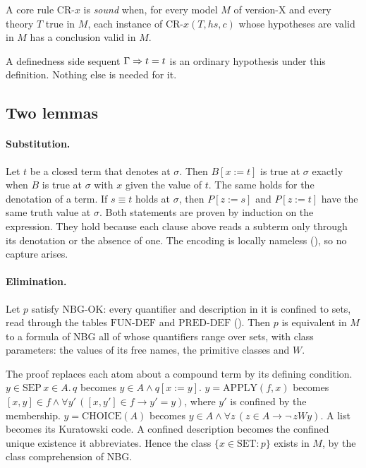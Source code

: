 \begin{dfn}\label{dfn:meta-sound}
A core rule $\mathrm{CR}\text{-}x$ is \emph{sound} when, for every model
$M$ of version-X and every theory $T$ true in $M$, each instance of
$\mathrm{CR}\text{-}x(T, \mathit{hs}, c)$ whose hypotheses are valid in
$M$ has a conclusion valid in $M$.
\end{dfn}

A definedness side sequent $\Gamma\Rightarrow t=t$ is an ordinary hypothesis
under this definition.  Nothing else is needed for it.

\subsection{Two lemmas}

\paragraph{Substitution.}  Let $t$ be a closed term that denotes at
$\sigma$.  Then $B[x:=t]$ is true at $\sigma$ exactly when $B$ is true
at $\sigma$ with $x$ given the value of $t$.  The same holds for the
denotation of a term.  If $s\equiv t$ holds at $\sigma$, then $P[z:=s]$
and $P[z:=t]$ have the same truth value at $\sigma$.  Both statements
are proven by induction on the expression.  They hold because each clause
above reads a subterm only through its denotation or the absence of one.
The encoding is locally nameless (), so no capture arises.

\paragraph{Elimination.}  Let $p$ satisfy $\mathrm{NBG\text{-}OK}$: every
quantifier and description in it is confined to sets, read through the
tables $\mathrm{FUN\text{-}DEF}$ and $\mathrm{PRED\text{-}DEF}$ ().
Then $p$ is equivalent in $M$ to a formula of NBG all of whose
quantifiers range over sets, with class parameters: the values of its
free names, the primitive classes and $W$.

The proof replaces each atom about a compound term by its defining
condition.  $y\in\mathrm{SEP}\,x{\in}A.\,q$ becomes
$y\in A\wedge q[x:=y]$.  $y=\mathrm{APPLY}(f,x)$ becomes
$[x,y]\in f\wedge\forall y'\,([x,y']\in f\to y'=y)$, where $y'$ is
confined by the membership.  $y=\mathrm{CHOICE}(A)$ becomes
$y\in A\wedge\forall z\,(z\in A\to\neg\,zWy)$.  A list becomes its
Kuratowski code.  A confined description becomes the confined unique
existence it abbreviates.  Hence the class $\{x\in\mathrm{SET} : p\}$
exists in $M$, by the class comprehension of NBG.

